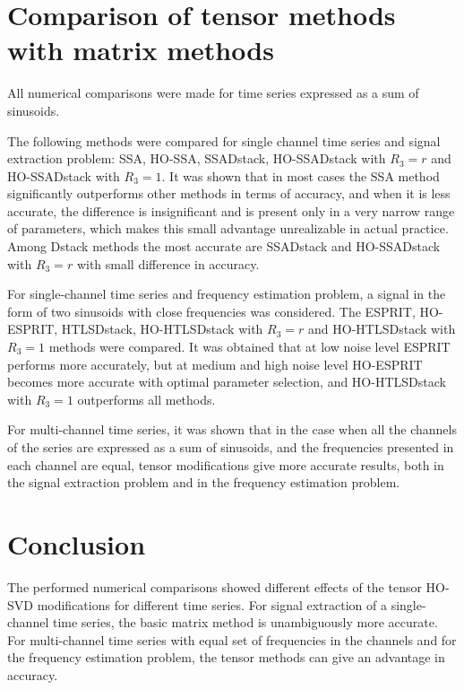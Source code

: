 \documentclass[12pt]{article}
\theoremstyle{definition}
\begin{document}
\section{Comparison of tensor methods with matrix methods}
All numerical comparisons were made for time series expressed as a
sum of sinusoids.

The following methods were compared for single channel time series
and signal extraction problem: SSA, HO-SSA, SSADstack, HO-SSADstack
with $R_3=r$ and HO-SSADstack with $R_3=1$. It was shown that in
most cases the SSA method significantly outperforms other methods in
terms of accuracy, and when it is less accurate, the difference is
insignificant and is present only in a very narrow range of
parameters, which makes this small advantage unrealizable in actual
practice. Among Dstack methods the most accurate are SSADstack and
HO-SSADstack with $R_3=r$ with small difference in accuracy.

For single-channel time series and frequency estimation problem, a
signal in the form of two sinusoids with close frequencies was
considered. The ESPRIT, HO-ESPRIT, HTLSDstack, HO-HTLSDstack with
$R_3=r$ and HO-HTLSDstack with $R_3=1$ methods were compared. It was
obtained that at low noise level ESPRIT performs more accurately, but
at medium and high noise level HO-ESPRIT becomes more accurate with
optimal parameter selection, and HO-HTLSDstack with $R_3=1$
outperforms all methods.

For multi-channel time series, it was shown that in the case when
all the channels of the series are expressed as a sum of sinusoids, and
the frequencies presented in each channel are equal, tensor
modifications give more accurate results, both in the signal
extraction problem and in the frequency estimation problem.

\section{Conclusion}
The performed numerical comparisons showed different effects of the
tensor HO-SVD modifications for different time series. For signal
extraction of a single-channel time series, the basic matrix method is
unambiguously more accurate. For multi-channel time series with equal
set of frequencies in the channels and for the frequency estimation
problem, the tensor methods can give an advantage in accuracy.

\end{document}
